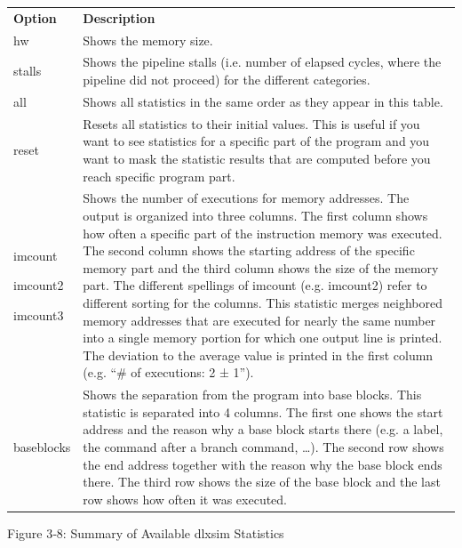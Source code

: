 \documentclass[
]{article}
\begin{document}
\begin{longtable}[]{@{}ll@{}}
\toprule
\endhead
\textbf{Option} & \textbf{Description}\tabularnewline
hw & Shows the memory size.\tabularnewline
stalls & Shows the pipeline stalls (i.e. number of elapsed cycles, where
the pipeline did not proceed) for the different
categories.\tabularnewline
all & Shows all statistics in the same order as they appear in this
table.\tabularnewline
reset & Resets all statistics to their initial values. This is useful if
you want to see statistics for a specific part of the program and you
want to mask the statistic results that are computed before you reach
specific program part.\tabularnewline
\begin{minipage}[t]{0.47\columnwidth}\raggedright
imcount

imcount2

imcount3\strut
\end{minipage} & \begin{minipage}[t]{0.47\columnwidth}\raggedright
Shows the number of executions for memory addresses. The output is
organized into three columns. The first column shows how often a
specific part of the instruction memory was executed. The second column
shows the starting address of the specific memory part and the third
column shows the size of the memory part. The different spellings of
imcount (e.g. imcount2) refer to different sorting for the columns. This
statistic merges neighbored memory addresses that are executed for
nearly the same number into a single memory portion for which one output
line is printed. The deviation to the average value is printed in the
first column (e.g. ``\# of executions: 2 ± 1'').\strut
\end{minipage}\tabularnewline
baseblocks & Shows the separation from the program into base blocks.
This statistic is separated into 4 columns. The first one shows the
start address and the reason why a base block starts there (e.g. a
label, the command after a branch command, \ldots). The second row shows
the end address together with the reason why the base block ends there.
The third row shows the size of the base block and the last row shows
how often it was executed.\tabularnewline
\bottomrule
\end{longtable}

Figure 3‑8: Summary of Available dlxsim Statistics
\end{document}

